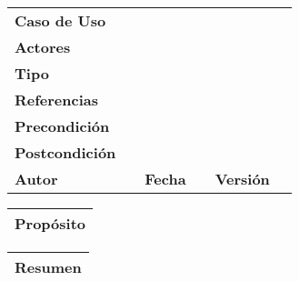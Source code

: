 \begin{table}[h]
\centering
\begin{tabular}{|l|lllll}
\cline{1-1} \cline{6-6}
\textbf{Caso de Uso}   & \textbf{}             & \textbf{}                           & \textbf{}             & \multicolumn{1}{l|}{\textbf{}}        & \multicolumn{1}{l|}{\textbf{}} \\ \cline{1-1} \cline{6-6} 
\textbf{Actores}       &                       &                                     &                       &                                       & \textbf{}                      \\ \cline{1-1}
\textbf{Tipo}          &                       &                                     &                       &                                       & \textbf{}                      \\ \cline{1-1}
\textbf{Referencias}   &                       &                                     &                       &                                       & \textbf{}                      \\ \cline{1-1}
\textbf{Precondición}  &                       &                                     &                       &                                       & \textbf{}                      \\ \cline{1-1}
\textbf{Postcondición} &                       &                                     &                       &                                       &                                \\ \cline{1-1} \cline{3-3} \cline{5-5}
\textbf{Autor}         & \multicolumn{1}{l|}{} & \multicolumn{1}{l|}{\textbf{Fecha}} & \multicolumn{1}{l|}{} & \multicolumn{1}{l|}{\textbf{Versión}} & \textbf{}                      \\ \cline{1-1} \cline{3-3} \cline{5-5}
\end{tabular}
\end{table}

\begin{table}[h]
\centering
\begin{tabular}{l}
\hline
\multicolumn{1}{|l|}{Propósito} \\ \hline
                               
\end{tabular}
\end{table}

\begin{table}[h]
\centering
\begin{tabular}{l}
\hline
\multicolumn{1}{|l|}{Resumen} \\ \hline
                               
\end{tabular}
\end{table}

